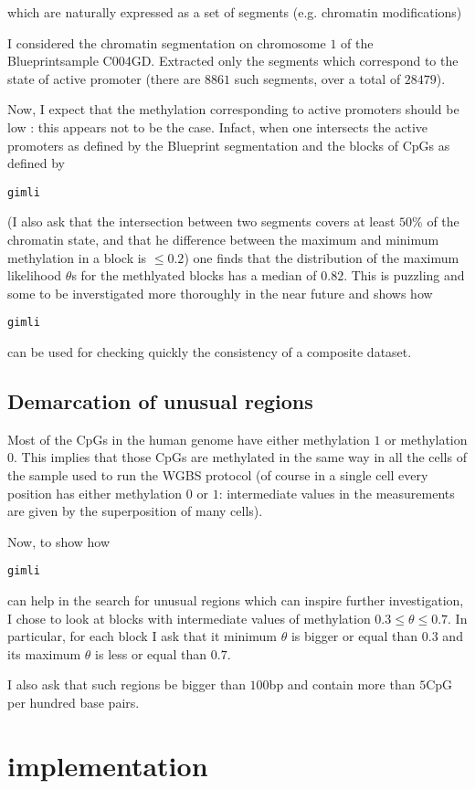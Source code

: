 \documentclass[11pt]{amsart}
\newcommand{\gimli}{\begin{verbatim}gimli\end{verbatim}}
\begin{document}
which are naturally expressed as a set of 
segments (e.g. chromatin modifications)

I considered the chromatin segmentation on chromosome $1$ of the
Blueprintsample C004GD. Extracted only the segments which correspond
to the state of active promoter (there are $8861$ such segments, over a total
of $28479$).

Now, I expect that the methylation corresponding to active promoters should be
low : this appears not to be the case. Infact, when one intersects the active
promoters as defined by the Blueprint segmentation and the blocks of CpGs as 
defined by \gimli (I also ask that the intersection between two segments covers
at least $50\%$ of the chromatin state, and that he difference between
the maximum and minimum methylation in a block is $\leq 0.2$) one finds
that the distribution of the maximum likelihood $\theta$s for the 
methlyated blocks has a median of $0.82$. This is puzzling and some 
to be inverstigated more thoroughly in the near future and shows how \gimli
can be used for checking quickly the consistency of a composite dataset.


\subsection{Demarcation of unusual regions} 

Most of the CpGs in the human genome have either methylation $1$ or
methylation $0$. This implies that those CpGs are methylated in the same
way in all the cells of the sample used to run the WGBS protocol
(of course in a single cell every position has either methylation $0$ or $1$:
intermediate values in the measurements are given by the superposition of 
many cells).

Now, to show how \gimli can help in the search for unusual regions which
can inspire further investigation, I chose to look at blocks with intermediate
values of methylation $0.3 \leq \theta \leq 0.7$. In particular, for each block
I ask that it minimum $\theta$ is bigger or equal than $0.3$ and its maximum $\theta$
is less or equal than $0.7$.

I also ask that such regions be bigger than $100$bp and contain more than 
$5$CpG per hundred base pairs.



\section{implementation}






\end{document}
